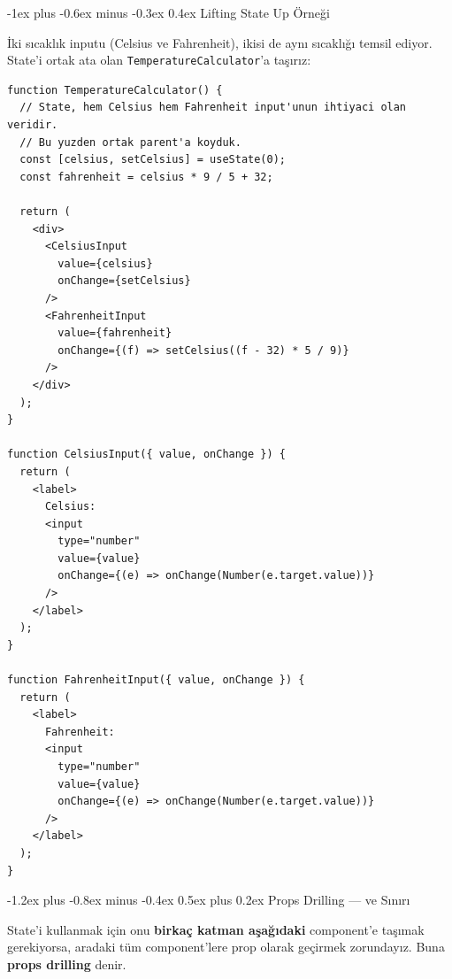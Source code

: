 \documentclass[12pt, a4paper]{article}
\makeatletter
\renewcommand{\subsection}{%
  \@startsection{subsection}{2}{\z@}%
    {-1.2ex plus -0.8ex minus -0.4ex}%
    {0.5ex plus 0.2ex}%
    {\normalfont\large\bfseries\sffamily\color{secondary}}%
}
\renewcommand{\subsubsection}{%
  \@startsection{subsubsection}{3}{\z@}%
    {-1ex plus -0.6ex minus -0.3ex}%
    {0.4ex}%
    {\normalfont\normalsize\bfseries\sffamily\color{accent}}%
}
\makeatother
\begin{document}
\vspace{6pt}

\subsubsection{Lifting State Up Örneği}

İki sıcaklık inputu (Celsius ve Fahrenheit), ikisi de aynı sıcaklığı temsil
ediyor. State'i ortak ata olan \texttt{TemperatureCalculator}'a taşırız:

\begin{tcolorbox}[enhanced, colback=codebg, colframe=gray!30,
    colbacktitle=primary!85!black, coltitle=white, arc=4pt,
    title={\sffamily\bfseries\small Lifting State Up}]
\begin{lstlisting}[style=jsxstyle]
function TemperatureCalculator() {
  // State, hem Celsius hem Fahrenheit input'unun ihtiyaci olan veridir.
  // Bu yuzden ortak parent'a koyduk.
  const [celsius, setCelsius] = useState(0);
  const fahrenheit = celsius * 9 / 5 + 32;

  return (
    <div>
      <CelsiusInput
        value={celsius}
        onChange={setCelsius}
      />
      <FahrenheitInput
        value={fahrenheit}
        onChange={(f) => setCelsius((f - 32) * 5 / 9)}
      />
    </div>
  );
}

function CelsiusInput({ value, onChange }) {
  return (
    <label>
      Celsius:
      <input
        type="number"
        value={value}
        onChange={(e) => onChange(Number(e.target.value))}
      />
    </label>
  );
}

function FahrenheitInput({ value, onChange }) {
  return (
    <label>
      Fahrenheit:
      <input
        type="number"
        value={value}
        onChange={(e) => onChange(Number(e.target.value))}
      />
    </label>
  );
}
\end{lstlisting}
\end{tcolorbox}

\newpage
\subsection{Props Drilling --- ve Sınırı}

\begin{definebox}
State'i kullanmak için onu \textbf{birkaç katman aşağıdaki} component'e
taşımak gerekiyorsa, aradaki tüm component'lere prop olarak geçirmek
zorundayız. Buna \textbf{props drilling} denir.
\end{definebox}
\end{document}
